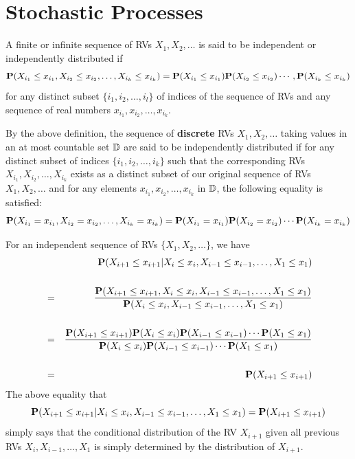 \section{Stochastic Processes}\label{S:StochProc}
\begin{definition}\label{D:IndRVs}
A finite or infinite sequence of RVs $X_1,X_2,\ldots$ is said to be independent or independently distributed if
\[
\mathbf{P}(X_{i_1} \leq x_{i_1}, X_{i_2} \leq x_{i_2}, \ldots,  X_{i_k} \leq x_{i_k} ) = \mathbf{P}(X_{i_1} \leq x_{i_1}) \mathbf{P}(X_{i_2} \leq x_{i_2}) \cdots,  \mathbf{P}(X_{i_k} \leq x_{i_k} )
\]
for any distinct subset $\{i_1,i_2,\ldots,i_l\}$ of indices of the sequence of RVs and any sequence of real numbers $x_{i_1},x_{i_2},\ldots,x_{i_k}$.

By the above definition, the sequence of {\bf discrete} RVs $X_1,X_2,\ldots$ taking values in an at most countable set $\mathbb{D}$ are said to be independently distributed if for any distinct subset of indices $\{i_1,i_2,\ldots,i_k\}$ such that the corresponding RVs $X_{i_1},X_{i_2},\ldots,X_{i_k}$ exists as a distinct subset of our original sequence of RVs $X_1,X_2,\ldots$ and for any elements $x_{i_1}, x_{i_2},\ldots,x_{i_k}$ in $\mathbb{D}$, the following equality is satisfied:
\[
\mathbf{P}(X_{i_1}= x_{i_1}, X_{i_2} = x_{i_2}, \ldots,  X_{i_k} = x_{i_k} ) = \mathbf{P}(X_{i_1} = x_{i_1}) \mathbf{P}(X_{i_2} = x_{i_2}) \cdots  \mathbf{P}(X_{i_k} = x_{i_k})
\]
\end{definition}
For an independent sequence of RVs $\{X_1,X_2,\ldots\}$, we have
\begin{eqnarray}
&&\mathbf{P}(X_{i+1} \leq x_{i+1} | X_{i} \leq x_{i}, X_{i-1} \leq x_{i-1}, \ldots, X_1 \leq x_1) \notag\\
\notag \\
&=& \frac{\mathbf{P}(X_{i+1} \leq x_{i+1}, X_{i} \leq x_{i}, X_{i-1} \leq x_{i-1}, \ldots, X_1 \leq x_1)}{\mathbf{P}(X_{i} \leq x_{i}, X_{i-1} \leq x_{i-1}, \ldots, X_1 \leq x_1)} \notag \\
\notag \\
&=& \frac{\mathbf{P}(X_{i+1} \leq x_{i+1}) \mathbf{P}(X_{i} \leq x_{i}) \mathbf{P}(X_{i-1} \leq x_{i-1}) \cdots \mathbf{P}(X_1 \leq x_1)}{\mathbf{P}(X_{i} \leq x_{i}) \mathbf{P}(X_{i-1} \leq x_{i-1}) \cdots \mathbf{P}(X_1 \leq x_1)} \notag \\
\notag \\
&=& \mathbf{P}(X_{i+1} \leq x_{i+1}) \notag 
\end{eqnarray}
The above equality that 
\[
\mathbf{P}(X_{i+1} \leq x_{i+1} | X_{i} \leq x_{i}, X_{i-1} \leq x_{i-1}, \ldots, X_1 \leq x_1) =  \mathbf{P}(X_{i+1} \leq x_{i+1}) 
\]
simply says that the conditional distribution of the RV $X_{i+1}$ given all previous RVs $X_i,X_{i-1},\ldots,X_1$ is simply determined by the distribution of $X_{i+1}$.

